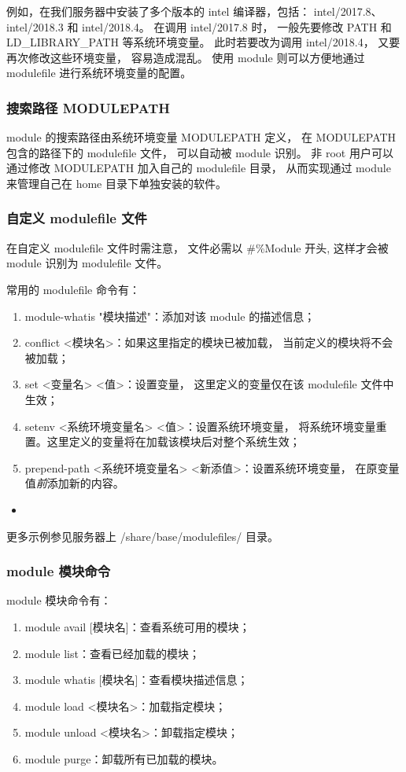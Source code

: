 \documentclass[UTF8]{ctexart}
\newcommand{\mynote}[1]{\colorbox{gray!35}{#1}}
\newcommand{\mynnote}[1]{\colorbox{gray!15}{\color{blue!65}#1}}
\newcommand{\insertbash}[2]{\begin{itemize}\item[]\end{itemize}}
\begin{document}
例如，在我们服务器中安装了多个版本的 intel 编译器，包括：
intel/2017.8、intel/2018.3 和 intel/2018.4。
在调用 intel/2017.8 时，
一般先要修改 PATH 和 LD\_LIBRARY\_PATH 等系统环境变量。
此时若要改为调用 intel/2018.4，
又要再次修改这些环境变量，
容易造成混乱。
使用 module 则可以方便地通过 modulefile 进行系统环境变量的配置。

\subsubsection{搜索路径 MODULEPATH}
module 的搜索路径由系统环境变量 MODULEPATH 定义，
在 MODULEPATH 包含的路径下的 modulefile 文件，
可以自动被 module 识别。
非 root 用户可以通过修改 MODULEPATH 加入自己的 modulefile 目录，
从而实现通过 module 来管理自己在 home 目录下单独安装的软件。

\subsubsection{自定义 modulefile 文件}
在自定义 modulefile  文件时需注意，
文件必需以 \mynote{\#\%Module} 开头,
这样才会被 module 识别为 modulefile 文件。

常用的 modulefile 命令有：
\begin{enumerate}[\hspace{15mm}（1）]
  \item \mynote{module-whatis "模块描述"}：添加对该 module 的描述信息；
  \item \mynote{conflict <模块名>}：如果这里指定的模块已被加载，
    当前定义的模块将不会被加载；
  \item \mynote{set <变量名> <值>}：设置变量，
    这里定义的变量仅在该 modulefile 文件中生效；
  \item \mynote{setenv <系统环境变量名> <值>}：设置系统环境变量，
    将系统环境变量重置。这里定义的变量将在加载该模块后对整个系统生效；
  \item \mynote{prepend-path <系统环境变量名> <新添值>}：设置系统环境变量，
    在原变量值{\em 前}添加新的内容。
\end{enumerate}

\insertbash{material/module.sh}{modulefile 文件书写示例}

更多示例参见服务器上 /share/base/modulefiles/ 目录。

\subsubsection{module 模块命令}
module 模块命令有：
\begin{enumerate}[\hspace{15mm}（1）]
  \item \mynnote{module avail [模块名]}：查看系统可用的模块；
  \item \mynnote{module list}：查看已经加载的模块；
  \item \mynnote{module whatis [模块名]}：查看模块描述信息；
  \item \mynnote{module load <模块名>}：加载指定模块；
  \item \mynnote{module unload <模块名>}：卸载指定模块；
  \item \mynnote{module purge}：卸载所有已加载的模块。
\end{enumerate}
\end{document}
